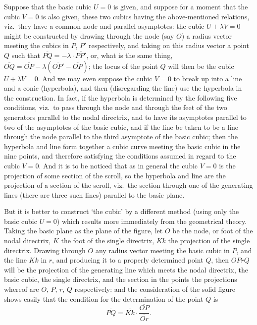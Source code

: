 \documentclass[11pt,a4paper]{article}
\begin{document}
Suppose that the basic cubic $U=0$ is given, and suppose for a moment that the cubic $V=0$ is also given, these two cubics having the above-mentioned relations, viz.\ they have a common node and parallel asymptotes: the cubic $U+\lambda V=0$ might be constructed by drawing through the node (say $O$) a radius vector meeting the cubics in $P$, $P'$ respectively, and taking on this radius vector a point $Q$ such that $\overline{PQ} = -\lambda \cdot \overline{PP'}$, or, what is the same thing, $\overline{OQ} = \overline{OP} - \lambda(\overline{OP'} - \overline{OP})$; the locus of the point $Q$ will then be the cubic $U+\lambda V=0$. And we may even suppose the cubic $V=0$ to break up into a line and a conic (hyperbola), and then (disregarding the line) use the hyperbola in the construction. In fact, if the hyperbola is determined by the following five conditions, viz.\ to pass through the node and through the feet of the two generators parallel to the nodal directrix, and to have its asymptotes parallel to two of the asymptotes of the basic cubic, and if the line be taken to be a line through the node parallel to the third asymptote of the basic cubic; then the hyperbola and line form together a cubic curve meeting the basic cubic in the nine points, and therefore satisfying the conditions assumed in regard to the cubic $V=0$. And it is to be noticed that as in general the cubic $V=0$ is the projection of some section of the scroll, so the hyperbola and line are the projection of a section of the scroll, viz.\ the section through one of the generating lines (there are three such lines) parallel to the basic plane.

But it is better to construct `the cubic' by a different method (using only the basic cubic $U=0$) which results more immediately from the geometrical theory. Taking the basic plane as the plane of the figure, let $O$ be the node, or foot of the nodal directrix, $K$ the foot of the single directrix, $Kk$ the projection of the single directrix. Drawing through $O$ any radius vector meeting the basic cubic in $P$, and the line $Kk$ in $r$, and producing it to a properly determined point $Q$, then $OPrQ$ will be the projection of the generating line which meets the nodal directrix, the basic cubic, the single directrix, and the section in the points the projections whereof are $O$, $P$, $r$, $Q$ respectively: and the consideration of the solid figure shows easily that the condition for the determination of the point $Q$ is
\[
\overline{PQ} = \overline{Kk} \cdot \frac{\overline{OP}}{\overline{Or}}.
\]
\end{document}
